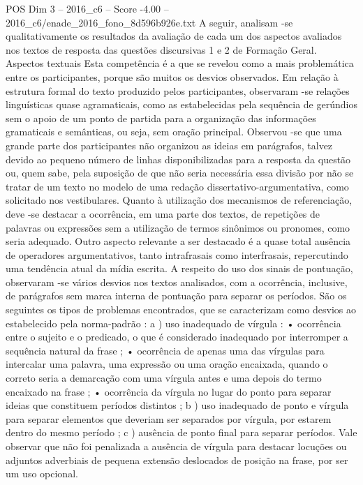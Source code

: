 \begin{textsample}{POS Dim 3 – 2016\_c6 – Score -4.00 – 2016\_c6/enade\_2016\_fono\_8d596b926e.txt}
A seguir, analisam -se qualitativamente os resultados da avaliação de cada um dos aspectos avaliados nos textos de resposta das questões discursivas 1 e 2 de Formação Geral.
Aspectos textuais Esta competência é a que se revelou como a mais problemática entre os participantes, porque são muitos os desvios observados.
Em relação à estrutura formal do texto produzido pelos participantes, observaram -se relações linguísticas quase agramaticais, como as estabelecidas pela sequência de gerúndios sem o apoio de um ponto de partida para a organização das informações gramaticais e semânticas, ou seja, sem oração principal.
Observou -se que uma grande parte dos participantes não organizou as ideias em parágrafos, talvez devido ao pequeno número de linhas disponibilizadas para a resposta da questão ou, quem sabe, pela suposição de que não seria necessária essa divisão por não se tratar de um texto no modelo de uma redação dissertativo-argumentativa, como solicitado nos vestibulares.
Quanto à utilização dos mecanismos de referenciação, deve -se destacar a ocorrência, em uma parte dos textos, de repetições de palavras ou expressões sem a utilização de termos sinônimos ou pronomes, como seria adequado.
Outro aspecto relevante a ser destacado é a quase total ausência de operadores argumentativos, tanto intrafrasais como interfrasais, repercutindo uma tendência atual da mídia escrita.
A respeito do uso dos sinais de pontuação, observaram -se vários desvios nos textos analisados, com a ocorrência, inclusive, de parágrafos sem marca interna de pontuação para separar os períodos.
São os seguintes os tipos de problemas encontrados, que se caracterizam como desvios ao estabelecido pela norma-padrão : a ) uso inadequado de vírgula : • ocorrência entre o sujeito e o predicado, o que é considerado inadequado por interromper a sequência natural da frase ; • ocorrência de apenas uma das vírgulas para intercalar uma palavra, uma expressão ou uma oração encaixada, quando o correto seria a demarcação com uma vírgula antes e uma depois do termo encaixado na frase ; • ocorrência da vírgula no lugar do ponto para separar ideias que constituem períodos distintos ; b ) uso inadequado de ponto e vírgula para separar elementos que deveriam ser separados por vírgula, por estarem dentro do mesmo período ; c ) ausência de ponto final para separar períodos.
Vale observar que não foi penalizada a ausência de vírgula para destacar locuções ou adjuntos adverbiais de pequena extensão deslocados de posição na frase, por ser um uso opcional.

\end{textsample}
